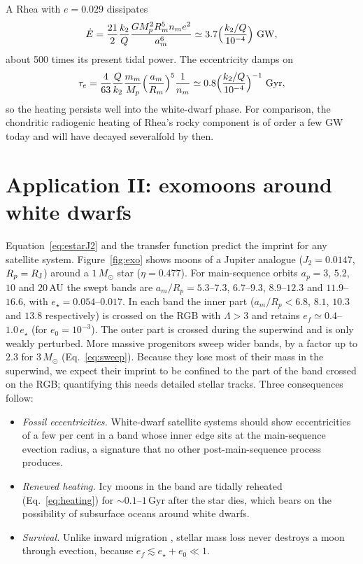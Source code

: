 \documentclass[11pt,a4paper]{article}
\newcommand{\estar}{e_\star}
\newcommand{\msun}{M_\odot}
\begin{document}
A Rhea with $e=0.029$ dissipates
\begin{equation}
\dot E=\frac{21}{2}\frac{k_2}{Q}\frac{GM_p^2R_m^5n_me^2}{a_m^6}\simeq3.7\Big(\frac{k_2/Q}{10^{-4}}\Big)\ {\rm GW},
\label{eq:heating}
\end{equation}
about 500 times its present tidal power. The eccentricity damps on
\begin{equation}
\tau_e=\frac{4}{63}\frac{Q}{k_2}\frac{m_m}{M_p}\Big(\frac{a_m}{R_m}\Big)^5\frac{1}{n_m}\simeq0.8\Big(\frac{k_2/Q}{10^{-4}}\Big)^{-1}\ {\rm Gyr},
\label{eq:damping}
\end{equation}
so the heating persists well into the white-dwarf phase. For comparison, the chondritic radiogenic heating of Rhea's rocky component is of order a few GW today and will have decayed severalfold by then.

\section{Application II: exomoons around white dwarfs}\label{sec:exo}

Equation~\eqref{eq:estarJ2} and the transfer function predict the imprint for any satellite system. Figure~\ref{fig:exo} shows moons of a Jupiter analogue ($J_2=0.0147$, $R_p=R_{\rm J}$) around a $1\,\msun$ star ($\eta=0.477$). For main-sequence orbits $a_p=3$, $5.2$, $10$ and $20$\,AU the swept bands are $a_m/R_p=5.3$--$7.3$, $6.7$--$9.3$, $8.9$--$12.3$ and $11.9$--$16.6$, with $\estar=0.054$--$0.017$. In each band the inner part ($a_m/R_p<6.8$, $8.1$, $10.3$ and $13.8$ respectively) is crossed on the RGB with $\Lambda>3$ and retains $e_f\simeq0.4$--$1.0\,\estar$ (for $e_0=10^{-3}$). The outer part is crossed during the superwind and is only weakly perturbed. More massive progenitors sweep wider bands, by a factor up to $2.3$ for $3\,\msun$ (Eq.~\ref{eq:sweep}). Because they lose most of their mass in the superwind, we expect their imprint to be confined to the part of the band crossed on the RGB; quantifying this needs detailed stellar tracks. Three consequences follow:
\begin{itemize}
\item \emph{Fossil eccentricities.} White-dwarf satellite systems should show eccentricities of a few per cent in a band whose inner edge sits at the main-sequence evection radius, a signature that no other post-main-sequence process produces.
\item \emph{Renewed heating.} Icy moons in the band are tidally reheated (Eq.~\ref{eq:heating}) for $\sim0.1$--$1$\,Gyr after the star dies, which bears on the possibility of subsurface oceans around white dwarfs.
\item \emph{Survival.} Unlike inward migration \citep{Spalding2016}, stellar mass loss never destroys a moon through evection, because $e_f\lesssim\estar+e_0\ll1$.
\end{itemize}
\end{document}
